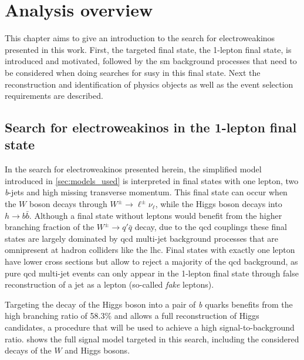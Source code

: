
\chapter{Analysis overview}\label{ch:1lepton}

\ifpdf
    \graphicspath{{chapter-analysis/Figs/Raster/}{chapter-analysis/Figs/PDF/}{chapter-analysis/Figs/}}
\else
    \graphicspath{{chapter-analysis/Figs/Vector/}{chapter-analysis/Figs/}}
\fi


This chapter aims to give an introduction to the search for electroweakinos presented in this work. First, the targeted final state, the 1-lepton final state, is introduced and motivated, followed by the \gls{sm} background processes that need to be considered when doing searches for \gls{susy} in this final state. Next the reconstruction and identification of physics objects as well as the event selection requirements are described.

\section{Search for electroweakinos in the 1-lepton final state}

In the search for electroweakinos presented herein, the simplified model introduced in \cref{sec:models_used} is interpreted in final states with one lepton, two \textit{b}-jets and high missing transverse momentum. This final state can occur when the $W$ boson decays through $W^\pm\rightarrow\ell^\pm\nu_\ell$, while the Higgs boson decays into $h\rightarrow b\bar{b}$. Although a final state without leptons would benefit from the higher branching fraction of the $W^\pm\rightarrow q'\bar{q}$ decay, due to the \gls{qcd} couplings these final states are largely dominated by \gls{qcd} multi-jet background processes that are omnipresent at hadron colliders like the \gls{lhc}. Final states with exactly one lepton have lower cross sections but allow to reject a majority of the \gls{qcd} background, as pure \gls{qcd} multi-jet events can only appear in the 1-lepton final state through false reconstruction of a jet as a lepton (so-called \textit{fake} leptons). 

Targeting the decay of the Higgs boson into a pair of \textit{b} quarks benefits from the high branching ratio of 58.3\% and allows a full reconstruction of Higgs candidates, a procedure that will be used to achieve a high signal-to-background ratio.   shows the full signal model targeted in this search, including the considered decays of the $W$ and Higgs bosons. 

